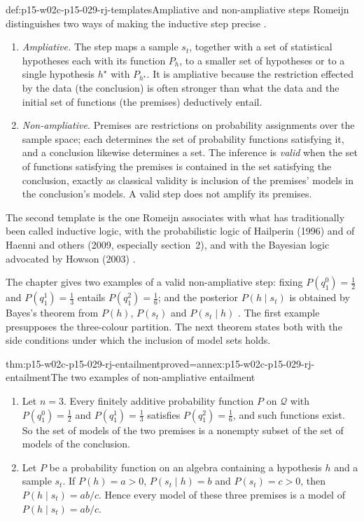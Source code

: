 \begin{hbdefinition}{def:p15-w02c-p15-029-rj-templates}{Ampliative and non-ampliative steps}
Romeijn distinguishes two ways of making the inductive step precise
\cite[p.~629]{Romeijn2011InductiveLogicStatistics}.
\begin{enumerate}
\item \emph{Ampliative.} The step maps a sample \(s_t\), together with a
  set of statistical hypotheses each with its function \(P_h\), to a
  smaller set of hypotheses or to a single hypothesis \(h^\star\) with
  \(P_{h^\star}\). It is ampliative because the restriction effected by
  the data (the conclusion) is often stronger than what the data and the
  initial set of functions (the premises) deductively entail.
\item \emph{Non-ampliative.} Premises are restrictions on probability
  assignments over the sample space; each determines the set of
  probability functions satisfying it, and a conclusion likewise
  determines a set. The inference is \emph{valid} when the set of
  functions satisfying the premises is contained in the set satisfying
  the conclusion, exactly as classical validity is inclusion of the
  premises' models in the conclusion's models. A valid step does not
  amplify its premises.
\end{enumerate}
The second template is the one Romeijn associates with what has
traditionally been called inductive logic, with the probabilistic logic
of Hailperin (1996) and of Haenni and others (2009, especially
section~2), and with the Bayesian logic advocated by Howson (2003)
\cite[p.~629]{Romeijn2011InductiveLogicStatistics}.
\end{hbdefinition}

The chapter gives two examples of a valid non-ampliative step: fixing
\(P(q^0_1)=\tfrac12\) and \(P(q^1_1)=\tfrac13\) entails
\(P(q^2_1)=\tfrac16\); and the posterior \(P(h\mid s_t)\) is obtained by
Bayes's theorem from \(P(h)\), \(P(s_t)\) and \(P(s_t\mid h)\)
\cite[p.~629]{Romeijn2011InductiveLogicStatistics}. The first example
presupposes the three-colour partition. The next theorem states both with
the side conditions under which the inclusion of model sets holds.

\begin{hbtheorem}{thm:p15-w02c-p15-029-rj-entailment}{proved=annex:p15-w02c-p15-029-rj-entailment}{The two examples of non-ampliative entailment}
\begin{enumerate}
\item Let \(n=3\). Every finitely additive probability function \(P\) on
  \(\mathcal Q\) with \(P(q^0_1)=\tfrac12\) and \(P(q^1_1)=\tfrac13\)
  satisfies \(P(q^2_1)=\tfrac16\), and such functions exist. So the set
  of models of the two premises is a nonempty subset of the set of
  models of the conclusion.
\item Let \(P\) be a probability function on an algebra containing a
  hypothesis \(h\) and a sample \(s_t\). If \(P(h)=a>0\),
  \(P(s_t\mid h)=b\) and \(P(s_t)=c>0\), then \(P(h\mid s_t)=ab/c\).
  Hence every model of these three premises is a model of
  \(P(h\mid s_t)=ab/c\).
\end{enumerate}
\end{hbtheorem}


